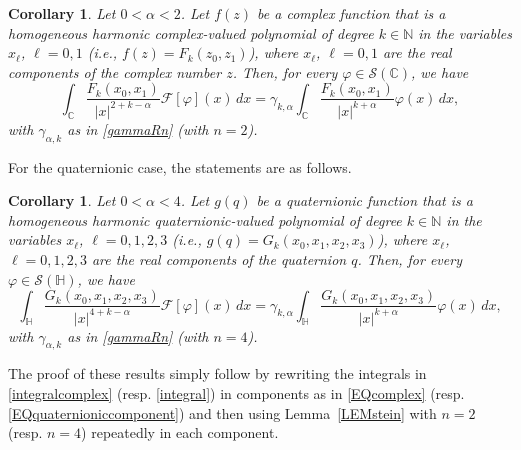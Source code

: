 \documentclass[reqno,11pt]{amsart}
\newtheorem{corollary}[theorem]{Corollary}
\theoremstyle{definition}
\begin{document}
\begin{corollary}\label{CORsteincomplex}
	Let $0 < \alpha <2$. Let  $f(z)$ be a complex function that is a homogeneous harmonic complex-valued polynomial of degree $k\in \mathbb{N}$ in the variables $x_\ell$, $\ell=0,1$ \textnormal{(}i.e., $f(z)=F_k(z_0,z_1)$\textnormal{)}, where $x_\ell$, $\ell=0,1$  are the real components of the complex number $z$. Then, for every $\varphi \in \mathcal{S}(\mathbb{C})$, we have
	\begin{equation}
		\label{integralcomplex}
		\int_{\mathbb{C}} \frac{F_k(x_0,x_1)}{|x|^{2+k-\alpha}} \mathcal{F}[\varphi ](x) \, dx= \gamma_{k,\alpha} \int_{\mathbb{C}} \frac{F_k(x_0,x_1)}{|x|^{k+\alpha}} \varphi(x)\,  dx,
	\end{equation}
	with $\gamma_{\alpha,k}$ as in \eqref{gammaRn} (with $n=2$).
\end{corollary}


For the quaternionic case, the statements are as follows.

\begin{corollary}
	Let $0 < \alpha <4$. Let  $g(q)$ be a quaternionic function that is a homogeneous harmonic quaternionic-valued polynomial of degree $k\in \mathbb{N}$ in the variables $x_\ell$, $\ell=0,1,2,3$ \textnormal{(}i.e., $g(q)=G_k(x_0,x_1,x_2,x_3)$\textnormal{)}, where $x_\ell$, $\ell=0,1,2,3$  are the real components of the quaternion $q$. Then, for every $\varphi \in \mathcal{S}(\mathbb{H})$, we have
	\begin{equation}
		\label{integral}
		\int_{\mathbb{H}} \frac{G_k(x_0,x_1,x_2,x_3)}{|x|^{4+k-\alpha}} \mathcal{F}[\varphi ](x) \, dx= \gamma_{k,\alpha} \int_{\mathbb{H}} \frac{G_k(x_0,x_1,x_2,x_3)}{|x|^{k+\alpha}} \varphi(x)\,  dx,
	\end{equation}
	with $\gamma_{\alpha,k}$ as in \eqref{gammaRn} (with $n=4$).
\end{corollary}

The proof of these results simply follow by rewriting the integrals in \eqref{integralcomplex} (resp. \eqref{integral}) in components as in \eqref{EQcomplex} (resp. \eqref{EQquaternioniccomponent}) and then using Lemma~\ref{LEMstein} with $n=2$ (resp. $n=4$) repeatedly in each component.
\end{document}
